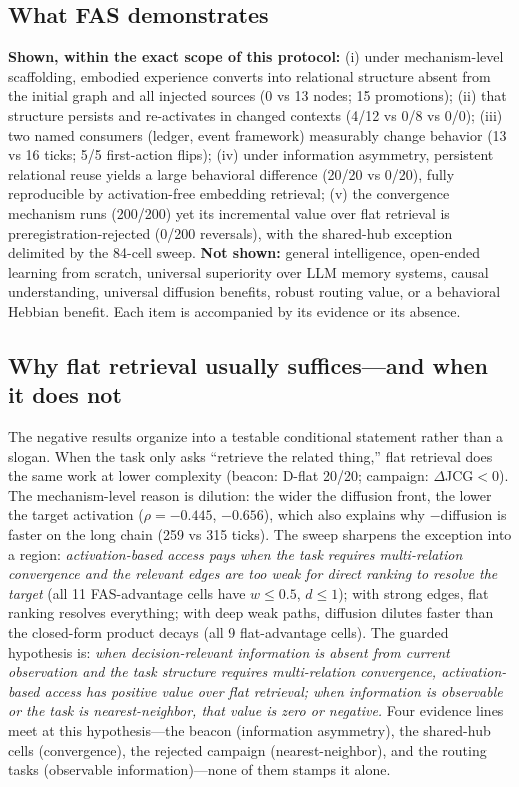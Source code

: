 \documentclass[10pt,a4paper]{article}
\begin{document}
\subsection{What FAS demonstrates}
\textbf{Shown, within the exact scope of this protocol:} (i) under mechanism-level scaffolding, embodied experience converts into relational structure absent from the initial graph and all injected sources (0 vs 13 nodes; 15 promotions); (ii) that structure persists and re-activates in changed contexts (4/12 vs 0/8 vs 0/0); (iii) two named consumers (ledger, event framework) measurably change behavior (13 vs 16 ticks; 5/5 first-action flips); (iv) under information asymmetry, persistent relational reuse yields a large behavioral difference (20/20 vs 0/20), fully reproducible by activation-free embedding retrieval; (v) the convergence mechanism runs (200/200) yet its incremental value over flat retrieval is preregistration-rejected (0/200 reversals), with the shared-hub exception delimited by the 84-cell sweep. \textbf{Not shown:} general intelligence, open-ended learning from scratch, universal superiority over LLM memory systems, causal understanding, universal diffusion benefits, robust routing value, or a behavioral Hebbian benefit. Each item is accompanied by its evidence or its absence.

\subsection{Why flat retrieval usually suffices---and when it does not}
The negative results organize into a testable conditional statement rather than a slogan. When the task only asks ``retrieve the related thing,'' flat retrieval does the same work at lower complexity (beacon: D-flat 20/20; campaign: $\Delta$JCG${<}0$). The mechanism-level reason is dilution: the wider the diffusion front, the lower the target activation ($\rho{=}{-}0.445$, ${-}0.656$), which also explains why $-$diffusion is faster on the long chain (259 vs 315 ticks). The sweep sharpens the exception into a region: \emph{activation-based access pays when the task requires multi-relation convergence and the relevant edges are too weak for direct ranking to resolve the target} (all 11 FAS-advantage cells have $w{\le}0.5$, $d{\le}1$); with strong edges, flat ranking resolves everything; with deep weak paths, diffusion dilutes faster than the closed-form product decays (all 9 flat-advantage cells). The guarded hypothesis is: \emph{when decision-relevant information is absent from current observation and the task structure requires multi-relation convergence, activation-based access has positive value over flat retrieval; when information is observable or the task is nearest-neighbor, that value is zero or negative.} Four evidence lines meet at this hypothesis---the beacon (information asymmetry), the shared-hub cells (convergence), the rejected campaign (nearest-neighbor), and the routing tasks (observable information)---none of them stamps it alone.
\end{document}
